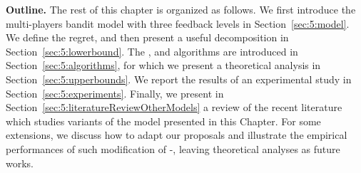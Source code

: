 


\textbf{Outline.}
%
The rest of this chapter is organized as follows.
We first introduce the multi-players bandit model with three feedback levels in Section~\ref{sec:5:model}.
We define the regret, and then present a useful decomposition in Section~\ref{sec:5:lowerbound}.
The \Selfish, \RandTopM{} and \MCTopM{} algorithms are introduced in Section~\ref{sec:5:algorithms},
for which we present a theoretical analysis in Section~\ref{sec:5:upperbounds}.
We report the results of an experimental study in Section~\ref{sec:5:experiments}.
Finally, we present in Section~\ref{sec:5:literatureReviewOtherModels} a review of the recent literature which studies variants of the model presented in this Chapter.
For some extensions, we discuss how to adapt our proposals and illustrate the empirical performances of such modification of \MCTopM-\klUCB{}, leaving theoretical analyses as future works.



